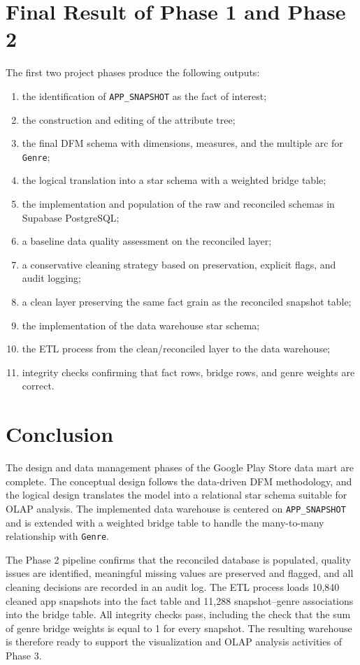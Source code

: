 \documentclass[11pt,a4paper]{article}
\newcommand{\dbms}{Supabase PostgreSQL}
\begin{document}
\section{Final Result of Phase 1 and Phase 2}
The first two project phases produce the following outputs:
\begin{enumerate}[leftmargin=1.5em]
    \item the identification of \texttt{APP\_SNAPSHOT} as the fact of interest;
    \item the construction and editing of the attribute tree;
    \item the final DFM schema with dimensions, measures, and the multiple arc for \texttt{Genre};
    \item the logical translation into a star schema with a weighted bridge table;
    \item the implementation and population of the raw and reconciled schemas in \dbms;
    \item a baseline data quality assessment on the reconciled layer;
    \item a conservative cleaning strategy based on preservation, explicit flags, and audit logging;
    \item a clean layer preserving the same fact grain as the reconciled snapshot table;
    \item the implementation of the data warehouse star schema;
    \item the ETL process from the clean/reconciled layer to the data warehouse;
    \item integrity checks confirming that fact rows, bridge rows, and genre weights are correct.
\end{enumerate}

\section{Conclusion}
The design and data management phases of the Google Play Store data mart are complete. The conceptual design follows the data-driven DFM methodology, and the logical design translates the model into a relational star schema suitable for OLAP analysis. The implemented data warehouse is centered on \texttt{APP\_SNAPSHOT} and is extended with a weighted bridge table to handle the many-to-many relationship with \texttt{Genre}.

The Phase 2 pipeline confirms that the reconciled database is populated, quality issues are identified, meaningful missing values are preserved and flagged, and all cleaning decisions are recorded in an audit log. The ETL process loads 10,840 cleaned app snapshots into the fact table and 11,288 snapshot--genre associations into the bridge table. All integrity checks pass, including the check that the sum of genre bridge weights is equal to 1 for every snapshot. The resulting warehouse is therefore ready to support the visualization and OLAP analysis activities of Phase 3.
\end{document}
